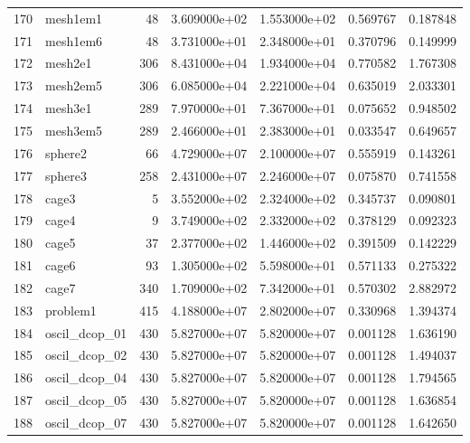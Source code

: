 \begin{tabular}{llrrrrr}
170 &                 mesh1em1 &    48 &  3.609000e+02 &  1.553000e+02 &  0.569767 &   0.187848 \\
171 &                 mesh1em6 &    48 &  3.731000e+01 &  2.348000e+01 &  0.370796 &   0.149999 \\
172 &                  mesh2e1 &   306 &  8.431000e+04 &  1.934000e+04 &  0.770582 &   1.767308 \\
173 &                 mesh2em5 &   306 &  6.085000e+04 &  2.221000e+04 &  0.635019 &   2.033301 \\
174 &                  mesh3e1 &   289 &  7.970000e+01 &  7.367000e+01 &  0.075652 &   0.948502 \\
175 &                 mesh3em5 &   289 &  2.466000e+01 &  2.383000e+01 &  0.033547 &   0.649657 \\
176 &                  sphere2 &    66 &  4.729000e+07 &  2.100000e+07 &  0.555919 &   0.143261 \\
177 &                  sphere3 &   258 &  2.431000e+07 &  2.246000e+07 &  0.075870 &   0.741558 \\
178 &                    cage3 &     5 &  3.552000e+02 &  2.324000e+02 &  0.345737 &   0.090801 \\
179 &                    cage4 &     9 &  3.749000e+02 &  2.332000e+02 &  0.378129 &   0.092323 \\
180 &                    cage5 &    37 &  2.377000e+02 &  1.446000e+02 &  0.391509 &   0.142229 \\
181 &                    cage6 &    93 &  1.305000e+02 &  5.598000e+01 &  0.571133 &   0.275322 \\
182 &                    cage7 &   340 &  1.709000e+02 &  7.342000e+01 &  0.570302 &   2.882972 \\
183 &                 problem1 &   415 &  4.188000e+07 &  2.802000e+07 &  0.330968 &   1.394374 \\
184 &            oscil\_dcop\_01 &   430 &  5.827000e+07 &  5.820000e+07 &  0.001128 &   1.636190 \\
185 &            oscil\_dcop\_02 &   430 &  5.827000e+07 &  5.820000e+07 &  0.001128 &   1.494037 \\
186 &            oscil\_dcop\_04 &   430 &  5.827000e+07 &  5.820000e+07 &  0.001128 &   1.794565 \\
187 &            oscil\_dcop\_05 &   430 &  5.827000e+07 &  5.820000e+07 &  0.001128 &   1.636854 \\
188 &            oscil\_dcop\_07 &   430 &  5.827000e+07 &  5.820000e+07 &  0.001128 &   1.642650 \\

\end{tabular}
